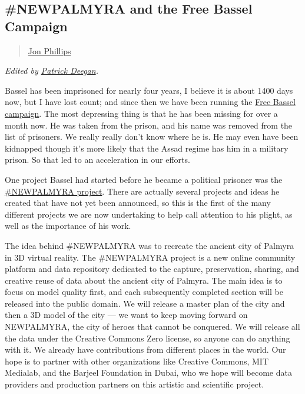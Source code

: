 \subsection{\#NEWPALMYRA and the Free Bassel
Campaign}\label{newpalmyra-and-the-free-bassel-campaign}

\begin{quote}
\hyperlink{jon-phillips}{Jon Phillips}
\end{quote}

\emph{Edited by
\href{../appendix/attributions.html\#patrick-w-deegan}{Patrick Deegan}.}

Bassel has been imprisoned for nearly four years, I believe it is about
1400 days now, but I have lost count; and since then we have been
running the \href{http://freebassel.org/}{Free Bassel campaign}. The
most depressing thing is that he has been missing for over a month now.
He was taken from the prison, and his name was removed from the list of
prisoners. We really really don't know where he is. He may even have
been kidnapped though it's more likely that the Assad regime has him in
a military prison. So that led to an acceleration in our efforts.

One project Bassel had started before he became a political prisoner was
the \href{http://newpalmyra.org/}{\#NEWPALMYRA project}. There are
actually several projects and ideas he created that have not yet been
announced, so this is the first of the many different projects we are
now undertaking to help call attention to his plight, as well as the
importance of his work.

The idea behind \#NEWPALMYRA was to recreate the ancient city of Palmyra
in 3D virtual reality. The \#NEWPALMYRA project is a new online
community platform and data repository dedicated to the capture,
preservation, sharing, and creative reuse of data about the ancient city
of Palmyra. The main idea is to focus on model quality first, and each
subsequently completed section will be released into the public domain.
We will release a master plan of the city and then a 3D model of the
city --- we want to keep moving forward on NEWPALMYRA, the city of
heroes that cannot be conquered. We will release all the data under the
Creative Commons Zero license, so anyone can do anything with it. We
already have contributions from different places in the world. Our hope
is to partner with other organizations like Creative Commons, MIT
Medialab, and the Barjeel Foundation in Dubai, who we hope will become
data providers and production partners on this artistic and scientific
project.

